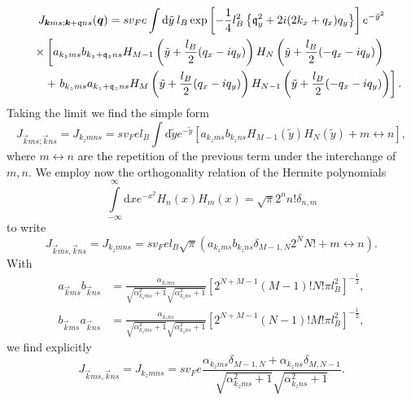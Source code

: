 \begin{multline}
  \label{eq:73}
    J_{\bm{k}ms; \bm{k}+\mathfrak{q} ns}(\bm{q}) =
    s v_F e \int \mathrm{d}\tilde{y} \: l_B
\exp \left[- \frac{1}{4} l_B^2 \left\{
    \mathfrak{q}_y^2 + 2 i (2k_x + q_x) q_y 
  \right\}\right]
  e^{-\tilde{y}^2}\\
  \quad\begin{split}
   &\times\left[
    a_{k_zms}b_{k_z + \mathfrak{q}_z ns}
    H_{M-1} \left( \tilde{y} + \frac{l_B}{2}(q_x - iq_y) \right)
    H_N\left( \tilde{y} + \frac{l_B}{2}(-q_x - iq_y) \right) \right.\\
    &\quad +\left.
    b_{k_zms} a_{k_z + \mathfrak{q}_z ns}
    H_M \left( \tilde{y} + \frac{l_B}{2}(q_x - iq_y) \right)
    H_{N-1} \left( \tilde{y} +  \frac{l_B}{2}(-q_x - iq_y)\right)
    \right].
  \end{split}
\end{multline}
Taking the limit we find the simple form
\begin{equation}
  \label{eq:74}
  J_{\vec{k} m s; \vec{k} n s} = J_{k_z m n s} =
  s v_F e l_B \int \mathrm{d}\tilde{y} e^{-\tilde{y} }
  \left[
    a_{k_zms} b_{k_z n s} H_{M-1}(\tilde{y} )H_N(\tilde{y} )
    + m \leftrightarrow n
  \right],
\end{equation}
where \( m \leftrightarrow n \) are the repetition of the previous term under the interchange of \( m, n \).
We employ now the orthogonality relation of the Hermite polynomials~\cite[Table~18.3.1]{NIST:DLMF}
\begin{equation}
  \label{eq:hermite-ortho}
  \int\limits_{-\infty}^{\infty} \mathrm{d}x e^{-x^2} H_n(x)H_m(x) = \sqrt{\pi} 2^{n} n! \delta_{n,m}
\end{equation}
to write
\begin{equation}
  J_{\vec{k} m s, \vec{k} n s} = J_{k_z m n s}
  = s v_F e l_B \sqrt{\pi} (a_{k_z ms} b_{k_z n s} \delta_{M-1, N} 2^N N! + m \leftrightarrow n).
\end{equation}
With
\begin{align}
  a_{\vec{k}ms}b_{\vec{k}ns} &= 
  \frac{\alpha_{k_z ms} }{
    \sqrt{\alpha_{k_z ms}^2 +1}
    \sqrt{\alpha_{k_z ns}^2 + 1}
  }
  \left[ 2^{N+M-1} (M-1)! N! \pi l_B^2 \right]^{-\frac{1}{2}},\\
  b_{\vec{k}ms}a_{\vec{k} ns} &= 
  \frac{\alpha_{k_z ns} }{
    \sqrt{\alpha_{k_z ms}^2 +1}
    \sqrt{\alpha_{k_z ns}^2 + 1}
  }
  \left[ 2^{N+M-1} (N-1)! M! \pi l_B^2 \right]^{-\frac{1}{2}},
\end{align}
we find explicitly
\begin{equation}
  J_{\vec{k} m s, \vec{k} n s} = J_{k_z m n s} =
  s v_F e
  \frac{\alpha_{k_z m s} \delta_{M-1, N} + \alpha_{k_z n s} \delta_{M, N-1}}{\sqrt{\alpha_{k_z m s}^2 + 1} \sqrt{\alpha_{k_z n s}^2 + 1}}.
\end{equation}


